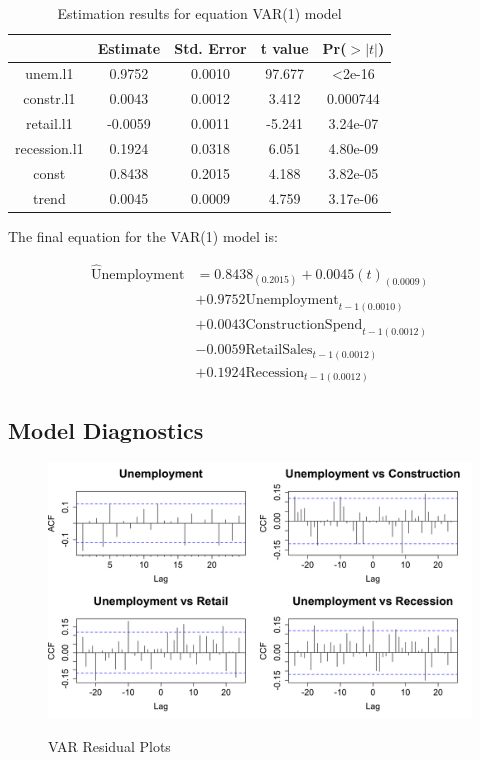 \documentclass[twoside,twocolumn]{article}
\begin{document}
{\small
\begin{table}[htb]
\centering
\caption{Estimation results for equation VAR(1) model}
\label{tab:estimates}
\begin{tabular}{@{}ccccc@{}}
\toprule
& Estimate & Std. Error & t value & Pr(\(>|t|\))     \\ \midrule
unem.l1      & 0.9752  & 0.0010 & 97.677 & \textless  2e-16 \\
constr.l1    & 0.0043 & 0.0012 & 3.412  & 0.000744 \\
retail.l1    & -0.0059 & 0.0011 & -5.241 & 3.24e-07 \\
recession.l1 & 0.1924  & 0.0318 & 6.051  & 4.80e-09 \\
const        & 0.8438  & 0.2015 & 4.188  & 3.82e-05 \\
trend        & 0.0045  & 0.0009 & 4.759  & 3.17e-06 \\ \bottomrule
\end{tabular}
\end{table}}

The final equation for the VAR(1) model is:
 
 \begin{align*}
  \widehat{\text{U}}\text{nemployment} &= 0.8438_{(0.2015)} +
  0.0045(t)_{(0.0009)}\\ 		
  &+ 0.9752\text{Unemployment}_{t-1 (0.0010)}\\
  &+ 0.0043\text{ConstructionSpend}_{t-1(0.0012)}\\
  &- 0.0059\text{RetailSales}_{t-1(0.0012)}\\
  &+ 0.1924\text{Recession}_{t-1(0.0012)}
  \end{align*} 
 
 \subsection{Model Diagnostics}
 \begin{figure}[hbt]
	\centering
	\caption{VAR Residual Plots}
	\includegraphics[width=\linewidth]{images/CCFplots}
	\label{fig:CCF}
\end{figure}
\end{document}
